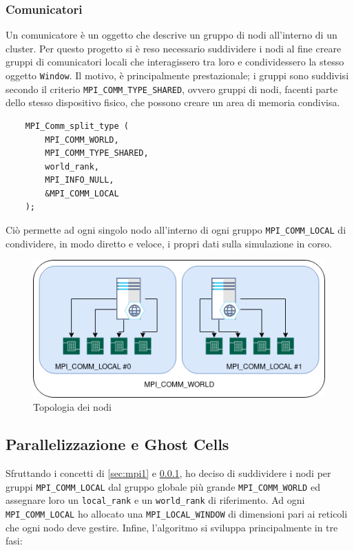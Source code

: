 \documentclass[12pt]{article}
\begin{document}
\subsubsection{Comunicatori}
\label{sec:mpi2}
Un comunicatore è un oggetto che descrive un gruppo di nodi all'interno di un cluster.
Per questo progetto si è reso necessario suddividere i nodi al fine creare gruppi di comunicatori locali che interagissero tra loro e condividessero la stesso oggetto \verb|Window|.
Il motivo, è principalmente prestazionale; i gruppi sono suddivisi secondo il criterio \verb|MPI_COMM_TYPE_SHARED|, ovvero gruppi di nodi, facenti parte dello stesso dispositivo fisico, che possono creare un area di memoria condivisa.

\begin{lstlisting}
    MPI_Comm_split_type (
        MPI_COMM_WORLD, 
        MPI_COMM_TYPE_SHARED, 
        world_rank,
        MPI_INFO_NULL, 
        &MPI_COMM_LOCAL
    );
\end{lstlisting}

Ciò permette ad ogni singolo nodo all'interno di ogni gruppo \verb|MPI_COMM_LOCAL| di condividere, in modo diretto e veloce, i propri dati sulla simulazione in corso.


\begin{figure}
    \centering
    \includegraphics[scale=0.5]{2}
    \caption{Topologia dei nodi}
    \label{fig:comm}
\end{figure}





\subsection{Parallelizzazione e Ghost Cells}
Sfruttando i concetti di \ref{sec:mpi1} e \ref{sec:mpi2}, ho deciso di suddividere i nodi per gruppi \verb|MPI_COMM_LOCAL| dal gruppo globale più grande \verb|MPI_COMM_WORLD| ed assegnare loro un \verb|local_rank| e un \verb|world_rank| di riferimento.
Ad ogni \verb|MPI_COMM_LOCAL| ho allocato una \verb|MPI_LOCAL_WINDOW| di dimensioni pari ai reticoli che ogni nodo deve gestire.
Infine, l'algoritmo si sviluppa principalmente in tre fasi:
\end{document}
